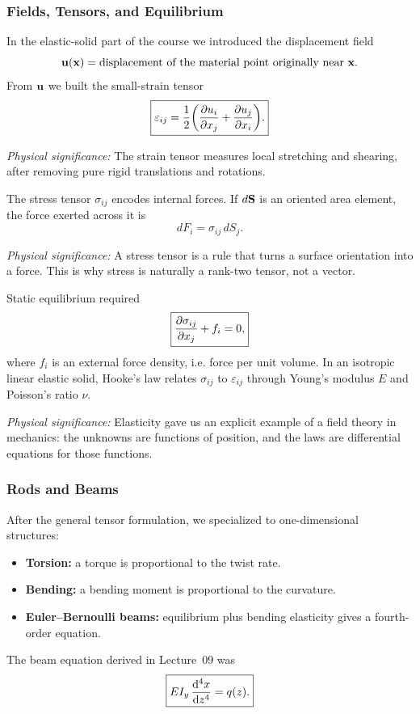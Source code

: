 \documentclass[../main.tex]{subfiles}
\begin{document}
\subsubsection*{Fields, Tensors, and Equilibrium}
In the elastic-solid part of the course we introduced the displacement field
\begin{equation}
  \mathbf{u}(\mathbf{x})
  =
  \text{displacement of the material point originally near } \mathbf{x}.
  \label{eq:lec10_displacement_field}
\end{equation}
From $\mathbf{u}$ we built the small-strain tensor
\begin{equation}
  \boxed{
  \varepsilon_{ij}
  =
  \frac{1}{2}\qty(\pdv{u_i}{x_j}+\pdv{u_j}{x_i}).}
  \label{eq:lec10_strain_recap}
\end{equation}

\textit{Physical significance:} The strain tensor measures local stretching and shearing, after removing pure rigid translations and rotations.

The stress tensor $\sigma_{ij}$ encodes internal forces. If $d\mathbf{S}$ is an oriented area element, the force exerted across it is
\begin{equation}
  \boxed{dF_i=\sigma_{ij}\,dS_j.}
  \label{eq:lec10_traction_recap}
\end{equation}

\textit{Physical significance:} A stress tensor is a rule that turns a surface orientation into a force. This is why stress is naturally a rank-two tensor, not a vector.

Static equilibrium required
\begin{equation}
  \boxed{\pdv{\sigma_{ij}}{x_j}+f_i=0,}
  \label{eq:lec10_elastic_equilibrium_recap}
\end{equation}
where $f_i$ is an external force density, i.e. force per unit volume. In an isotropic linear elastic solid, Hooke's law relates $\sigma_{ij}$ to $\varepsilon_{ij}$ through Young's modulus $E$ and Poisson's ratio $\nu$.

\textit{Physical significance:} Elasticity gave us an explicit example of a field theory in mechanics: the unknowns are functions of position, and the laws are differential equations for those functions.

\subsubsection*{Rods and Beams}
After the general tensor formulation, we specialized to one-dimensional structures:
\begin{itemize}
  \item \textbf{Torsion:} a torque is proportional to the twist rate.
  \item \textbf{Bending:} a bending moment is proportional to the curvature.
  \item \textbf{Euler--Bernoulli beams:} equilibrium plus bending elasticity gives a fourth-order equation.
\end{itemize}
The beam equation derived in Lecture~09 was
\begin{equation}
  \boxed{EI_y\,\dv[4]{x}{z}=q(z).}
  \label{eq:lec10_beam_recap}
\end{equation}
\end{document}
